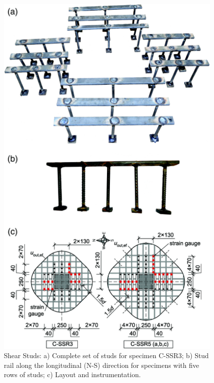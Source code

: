 \documentclass[twocolumn]{article} %
\begin{document}
\begin{figure}\centering
    \includegraphics[width=\columnwidth]{Figures/i2018f2.png}
    \caption{Shear Studs\citep{isufi2018}: a) Complete set of studs for specimen C-SSR3; b) Stud rail along the longitudinal (N-S) direction for specimens with five rows of studs; c) Layout and instrumentation.}
    \label{i2018f2}
    \end{figure}
\end{document}
